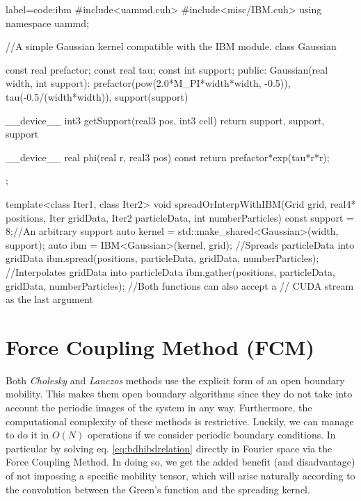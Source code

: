 \documentclass[ twoside,openright,titlepage,numbers=noenddot,%
headinclude,footinclude,cleardoublepage=empty,abstract=on,
BCOR=5mm,paper=a4,fontsize=11pt, dvipsnames
]{scrreprt}
\begin{document}
\begin{code2}  {label=code:ibm}
#include<uammd.cuh>
#include<misc/IBM.cuh>
using namespace uammd;

//A simple Gaussian kernel compatible with the IBM module.
class Gaussian{
  const real prefactor;
  const real tau;
  const int support;
public:
  Gaussian(real width, int support):
    prefactor(pow(2.0*M_PI*width*width, -0.5)),
    tau(-0.5/(width*width)),
    support(support){}

  __device__ int3 getSupport(real3 pos, int3 cell){
    return {support, support, support}
  }

  __device__ real phi(real r, real3 pos) const{
    return prefactor*exp(tau*r*r);
  }
};

template<class Iter1, class Iter2>
void spreadOrInterpWithIBM(Grid grid, real4* positions,
                   Iter gridData, Iter2 particleData,
                   int numberParticles){
  const support = 8;//An arbitrary support
  auto kernel = std::make_shared<Gaussian>(width, support);
  auto ibm = IBM<Gaussian>(kernel, grid);
  //Spreads particleData into gridData
  ibm.spread(positions, particleData, 
             gridData, numberParticles);
  //Interpolates gridData into particleData
  ibm.gather(positions, particleData,
             gridData, numberParticles);
  //Both functions can also accept a 
  // CUDA stream as the last argument
}
\end{code2}





\section{Force Coupling Method (FCM)}\label{sec:fcm}
Both \emph{Cholesky} and \emph{Lanczos} methods use the explicit form of an open boundary mobility. This makes them open boundary algorithms since they do not take into account the periodic images of the system in any way. Furthermore, the computational complexity of these methods is restrictive. Luckily, we can manage to do it in $O(N)$ operations if we consider periodic boundary conditions. In particular by solving eq. \eqref{eq:bdhibdrelation} directly in Fourier space via the Force Coupling Method\cite{Keaveny2014}. In doing so, we get the added benefit (and disadvantage) of not impossing a specific mobility tensor, which will arise naturally according to the convolution between the Green's function and the spreading kernel.
\end{document}
